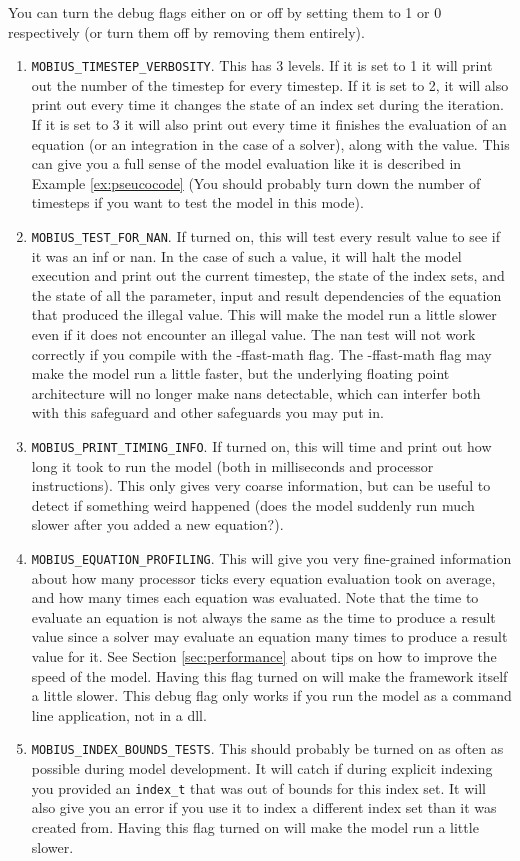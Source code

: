 \documentclass[11pt]{article}
\theoremstyle{definition}
\begin{document}
You can turn the debug flags either on or off by setting them to 1 or 0 respectively (or turn them off by removing them entirely).

\begin{enumerate}[i]
\item {\tt MOBIUS\_TIMESTEP\_VERBOSITY}. This has 3 levels. If it is set to 1 it will print out the number of the timestep for every timestep. If it is set to 2, it will also print out every time it changes the state of an index set during the iteration. If it is set to 3 it will also print out every time it finishes the evaluation of an equation (or an integration in the case of a solver), along with the value. This can give you a full sense of the model evaluation like it is described in Example \ref{ex:pseucocode} (You should probably turn down the number of timesteps if you want to test the model in this mode).
\item {\tt MOBIUS\_TEST\_FOR\_NAN}. If turned on, this will test every result value to see if it was an inf or nan. In the case of such a value, it will halt the model execution and print out the current timestep, the state of the index sets, and the state of all the parameter, input and result dependencies of the equation that produced the illegal value. This will make the model run a little slower even if it does not encounter an illegal value. The nan test will not work correctly if you compile with the -ffast-math flag. The -ffast-math flag may make the model run a little faster, but the underlying floating point architecture will no longer make nans detectable, which can interfer both with this safeguard and other safeguards you may put in.
\item {\tt MOBIUS\_PRINT\_TIMING\_INFO}. If turned on, this will time and print out how long it took to run the model (both in milliseconds and processor instructions). This only gives very coarse information, but can be useful to detect if something weird happened (does the model suddenly run much slower after you added a new equation?).
\item {\tt MOBIUS\_EQUATION\_PROFILING}. This will give you very fine-grained information about how many processor ticks every equation evaluation took on average, and how many times each equation was evaluated. Note that the time to evaluate an equation is not always the same as the time to produce a result value since a solver may evaluate an equation many times to produce a result value for it. See Section \ref{sec:performance} about tips on how to improve the speed of the model. Having this flag turned on will make the framework itself a little slower. This debug flag only works if you run the model as a command line application, not in a dll.
\item {\tt MOBIUS\_INDEX\_BOUNDS\_TESTS}. This should probably be turned on as often as possible during model development. It will catch if during explicit indexing you provided an {\tt index\_t} that was out of bounds for this index set. It will also give you an error if you use it to index a different index set than it was created from. Having this flag turned on will make the model run a little slower.
\end{enumerate}
\end{document}

